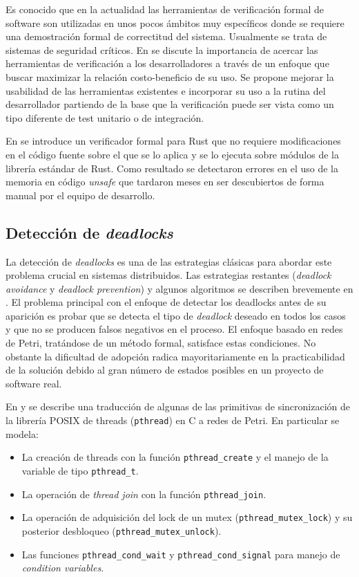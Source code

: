 \documentclass[12pt]{article}
\begin{document}
Es conocido que en la actualidad las herramientas de verificación formal de software son utilizadas en unos pocos ámbitos muy específicos
donde se requiere una demostración formal de correctitud del sistema. Usualmente se trata de sistemas de seguridad críticos.
En \cite{reid:hatra:2020} se discute la importancia de acercar las herramientas de verificación a los desarrolladores
a través de un enfoque que buscar maximizar la relación costo-beneficio de su uso.
Se propone mejorar la usabilidad de las herramientas existentes e incorporar su uso a la rutina del desarrollador partiendo
de la base que la verificación puede ser vista como un tipo diferente de test unitario o de integración.

En \cite{toman2015} se introduce un verificador formal para Rust que no requiere modificaciones en el código fuente sobre el que se lo aplica y
se lo ejecuta sobre módulos de la librería estándar de Rust.
Como resultado se detectaron errores en el uso de la memoria en código \textit{unsafe}
que tardaron meses en ser descubiertos de forma manual por el equipo de desarrollo.

\subsection{Detección de \textit{deadlocks}}

La detección de \textit{deadlocks} es una de las estrategias clásicas para abordar este problema crucial en sistemas distribuidos.
Las estrategias restantes (\textit{deadlock avoidance} y \textit{deadlock prevention}) y algunos algoritmos se describen brevemente en \cite{singhal1989}.
El problema principal con el enfoque de detectar los deadlocks antes de su aparición es probar que
se detecta el tipo de \textit{deadlock} deseado en todos los casos y que no se producen falsos negativos en el proceso.
El enfoque basado en redes de Petri, tratándose de un método formal, satisface estas condiciones.
No obstante la dificultad de adopción radica mayoritariamente en la practicabilidad de la solución debido al gran número de estados posibles en un proyecto de software real.

En \cite{kavi-moshtaghi2002} y \cite{moshtaghi2001} se describe una traducción de algunas de las primitivas
de sincronización de la librería POSIX de threads (\texttt{pthread}) en C a redes de Petri.
En particular se modela:

\begin{itemize}
    \item La creación de threads con la función \texttt{pthread\_create} y el manejo de la variable de tipo \texttt{pthread\_t}.
    \item La operación de \textit{thread join} con la función \texttt{pthread\_join}.
    \item La operación de adquisición del lock de un mutex (\texttt{pthread\_mutex\_lock}) y su posterior desbloqueo (\texttt{pthread\_mutex\_unlock}).
    \item Las funciones \texttt{pthread\_cond\_wait} y \texttt{pthread\_cond\_signal} para manejo de \textit{condition variables}.
\end{itemize}
\end{document}
